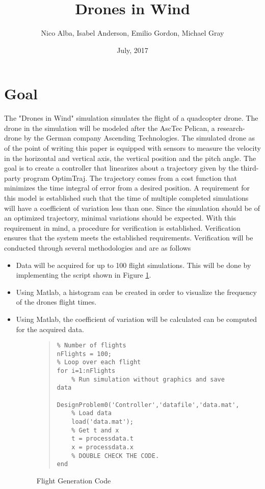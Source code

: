 \documentclass[12pt]{article}
\title{Drones in Wind}
\author{Nico Alba, Isabel Anderson, Emilio Gordon, Michael Gray}
\date{July, 2017}
\begin{document}
\maketitle


\section{Goal}
The "Drones in Wind" simulation simulates the flight of a quadcopter drone. The drone in the simulation will be modeled after the AscTec Pelican, a research-drone by the German company Ascending Technologies. The simulated drone as of the point of writing this paper is equipped with sensors to measure the velocity in the horizontal and vertical axis, the vertical position and the pitch angle. 
\newline \newline
The goal is to create a controller that linearizes about a trajectory given by the third-party program OptimTraj. The trajectory comes from a cost function that minimizes the time integral of error from a desired position. A requirement for this model is established such that the time of multiple completed simulations will have a coefficient of variation less than one. Since the simulation should be of an optimized trajectory, minimal variations should be expected. With this requirement in mind, a procedure for verification is established. Verification ensures that the system meets the established requirements. Verification will be conducted through several methodologies and are as follows
\begin{itemize}
\item Data will be acquired for up to 100 flight simulations. This will be done by implementing the script shown in Figure \ref{fig:fgc}.
\item Using Matlab, a histogram can be created in order to visualize the frequency of the drones flight times. 
\item Using Matlab, the coefficient of variation will be calculated can be computed for the acquired data.
\begin{figure}[H]
\begin{quote}
\begin{lstlisting}
% Number of flights
nFlights = 100;
% Loop over each flight
for i=1:nFlights
    % Run simulation without graphics and save data
    DesignProblem0('Controller','datafile','data.mat','display',false);
    % Load data
    load('data.mat');
    % Get t and x
    t = processdata.t
    x = processdata.x
    % DOUBLE CHECK THE CODE.
end
\end{lstlisting}
\end{quote}
\caption{Flight Generation Code\label{fig:fgc}}
\end{figure}
\end{itemize}
\end{document}
